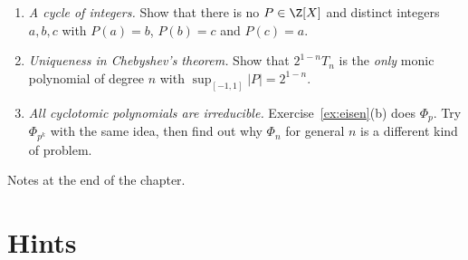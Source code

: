 \begin{challenge}
\begin{enumerate}[label=(\arabic*)]
\item \emph{A cycle of integers.} Show that there is no $P\in\Z[X]$ and distinct integers $a,b,c$ with $P(a)=b$, $P(b)=c$ and $P(c)=a$.
\item \emph{Uniqueness in Chebyshev's theorem.} Show that $2^{1-n}T_n$ is the \emph{only} monic polynomial of degree $n$ with $\sup_{[-1,1]}|P|=2^{1-n}$.
\item \emph{All cyclotomic polynomials are irreducible.} Exercise~\ref{ex:eisen}(b) does $\Phi_p$. Try $\Phi_{p^k}$ with the same idea, then find out why $\Phi_n$ for general $n$ is a different kind of problem.
\end{enumerate}
Notes at the end of the chapter.
\end{challenge}

\section{Hints}

